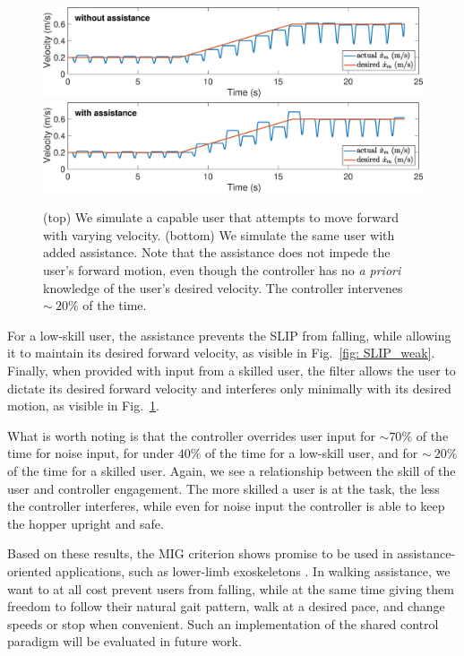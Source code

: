 \begin{figure}[!t]
\begin{center}
   	\includegraphics[width=1\columnwidth, keepaspectratio]{SLIP2_noassist_velocity.eps}
   	\includegraphics[width=1\columnwidth, keepaspectratio]{SLIP2_assist_velocity.eps}
\end{center}
\caption{(top) We simulate a capable user that attempts to move forward with varying velocity. (bottom) We simulate the same user with added assistance. Note that the assistance does not impede the user's forward motion, even though the controller has no \textit{a priori} knowledge of the user's desired velocity. The controller intervenes $\sim~20\%$ of the time.}
\label{fig: SLIP_skilled}
\end{figure}

For a low-skill user, the assistance prevents the SLIP from falling, while allowing it to maintain its desired forward velocity, as visible in Fig.~\ref{fig: SLIP_weak}. Finally, when provided with input from a skilled user, the filter allows the user to dictate its desired forward velocity and interferes only minimally with its desired motion, as visible in Fig.~\ref{fig: SLIP_skilled}. 

What is worth noting is that the controller overrides user input for $\sim70\%$ of the time for noise input, for under $40\%$ of the time for a low-skill user, and for $\sim~20\%$ of the time for a skilled user. Again, we see a relationship between the skill of the user and controller engagement. The more skilled a user is at the task, the less the controller interferes, while even for noise input the controller is able to keep the hopper upright and safe. 

Based on these results, the MIG criterion shows promise to be used in assistance-oriented applications, such as lower-limb exoskeletons \cite{exoskeletons}. In walking assistance, we want to at all cost prevent users from falling, while at the same time giving them freedom to follow their natural gait pattern, walk at a desired pace, and change speeds or stop when convenient. Such an implementation of the shared control paradigm will be evaluated in future work. 

